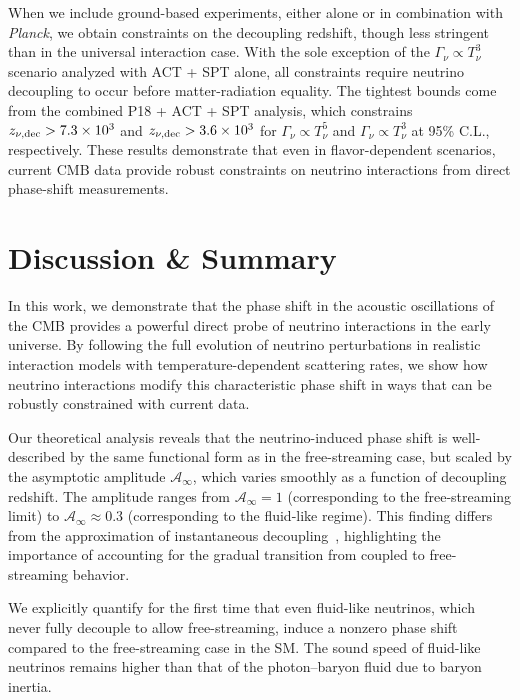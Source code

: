 When we include ground-based experiments, either alone or in combination with \textit{Planck}, we obtain constraints on the decoupling redshift, though less stringent than in the universal interaction case. With the sole exception of the $\Gamma_\nu \propto T_\nu^3$ scenario analyzed with ACT + SPT alone, all constraints require neutrino decoupling to occur before matter-radiation equality. The tightest bounds come from the combined P18 + ACT + SPT analysis, which constrains $z_{\nu,\rm dec} > 7.3 \times 10^3$ and $z_{\nu,\rm dec} > 3.6 \times 10^3$ for $\Gamma_\nu \propto T_\nu^5$ and $\Gamma_\nu \propto T_\nu^3$ at 95\% C.L., respectively. These results demonstrate that even in flavor-dependent scenarios, current CMB data provide robust constraints on neutrino interactions from direct phase-shift measurements.


\section{Discussion \& Summary}
\label{sec:ch13-4}

\noindent In this work, we demonstrate that the phase shift in the acoustic oscillations of the CMB provides a powerful direct probe of neutrino interactions in the early universe. By following the full evolution of neutrino perturbations in realistic interaction models with temperature-dependent scattering rates, we show how neutrino interactions modify this characteristic phase shift in ways that can be robustly constrained with current data.

Our theoretical analysis reveals that the neutrino-induced phase shift is well-described by the same functional form as in the free-streaming case, but scaled by the asymptotic amplitude $\mathcal{A}_\infty$, which varies smoothly as a function of decoupling redshift. The amplitude ranges from $\mathcal{A}_\infty = 1$ (corresponding to the free-streaming limit) to $\mathcal{A}_\infty \approx 0.3$ (corresponding to the fluid-like regime). This finding differs from the approximation of instantaneous decoupling~\cite{Choi:2018gho,Loverde:2022wih}, highlighting the importance of accounting for the gradual transition from coupled to free-streaming behavior.

We explicitly quantify for the first time that even fluid-like neutrinos, which never fully decouple to allow free-streaming, induce a nonzero phase shift compared to the free-streaming case in the SM. The sound speed of fluid-like neutrinos remains higher than that of the photon--baryon fluid due to baryon inertia.

